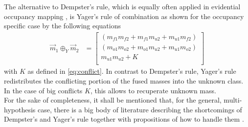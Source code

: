 The alternative to Dempster's rule, which is equally often applied in evidential occupancy mapping \cite{wirges2018evidential,kurdej2012map,reineking2013evidential}, is Yager's rule of combination \cite{yager1987dempster} as shown for the occupancy specific case by the following equations
\begin{align}
	\label{eq:yagers_rule}
	\vec{m}_1 \oplus_Y \vec{m}_2 &=  
	\begin{bmatrix} 
		(m_{f1}m_{f2} + m_{f1}m_{u2} + m_{u1}m_{f2})\\
		(m_{o1}m_{o2} + m_{o1}m_{u2} + m_{u1}m_{o2})\\
		m_{u1}m_{u2} + K\\
	\end{bmatrix}
\end{align}
with $K$ as defined in \eqref{eq:conflict}. In contrast to Dempster's rule, Yager's rule redistributes the conflicting portion of the fused masses into the unknown class. In the case of big conflicts $K$, this allows to recuperate unknown mass.
\\
For the sake of completeness, it shall be mentioned that, for the general, multi-hypothesis case, there is a big body of literature describing the shortcomings of Dempster's and Yager's rule together with propositions of how to handle them \cite{zadeh1979validity,han2008modified,yang2013evidential,zhang2020new}. 
%
